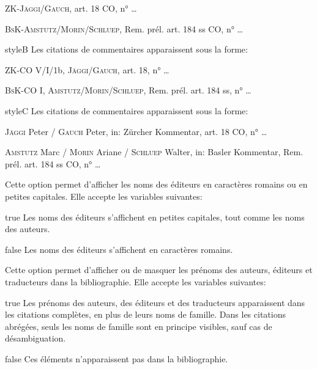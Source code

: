 \documentclass[a4paper]{ltxdockit}[2011/03/25]
\begin{document}
\begin{optionlist}
\begin{valuelist}
\begin{center}
\vspace{0.3cm}
\textsc{ZK-Jäggi/Gauch}, art. 18 CO, n° …
\vspace{0.3cm}

\textsc{BsK-Amstutz/Morin/Schluep}, Rem. prél. art. 184 ss CO, n° …
\vspace{0.7cm}
\end{center}

\item[styleB] Les citations de commentaires apparaissent sous la forme: 

\begin{center}
\vspace{0.3cm}
\textsc{ZK-CO} V/I/1b, \textsc{Jäggi/Gauch}, art. 18, n° …
\vspace{0.3cm}

\textsc{BsK-CO} I, \textsc{Amstutz/Morin/Schluep}, Rem. prél. art. 184 ss, n° …
\vspace{0.7cm}
\end{center}

\item[styleC] Les citations de commentaires apparaissent sous la forme:
\begin{center}
\vspace{0.3cm}
\textsc{Jäggi} Peter / \textsc{Gauch} Peter, in: Zürcher Kommentar, art. 18 CO, n° …
\vspace{0.3cm}

\textsc{Amstutz} Marc / \textsc{Morin} Ariane / \textsc{Schluep} Walter, in: Basler Kommentar, Rem. prél. art. 184 ss CO, n° …
\end{center}

\end{valuelist}

\bigskip
{}\label{editorssc}
Cette option permet d'afficher les noms des éditeurs en caractères romains ou en petites capitales. Elle accepte les variables suivantes:
\begin{valuelist}
\item[true] Les noms des éditeurs s'affichent en petites capitales, tout comme les noms des auteurs.
\item[false] Les noms des éditeurs s'affichent en caractères romains.
\end{valuelist}

\bigskip
{}\label{firstnames}
Cette option permet d'afficher ou de masquer les prénoms des auteurs, éditeurs et traducteurs dans la bibliographie. Elle accepte les variables suivantes:
\begin{valuelist}
\item[true] Les prénoms des auteurs, des éditeurs et des traducteurs apparaissent dans les citations complètes, en plus de leurs noms de famille. Dans les citations abrégées, seuls les noms de famille sont en principe visibles, sauf cas de désambiguation.
\item[false] Ces éléments n'apparaissent pas dans la bibliographie.
\end{valuelist}


\end{optionlist}
\end{document}
